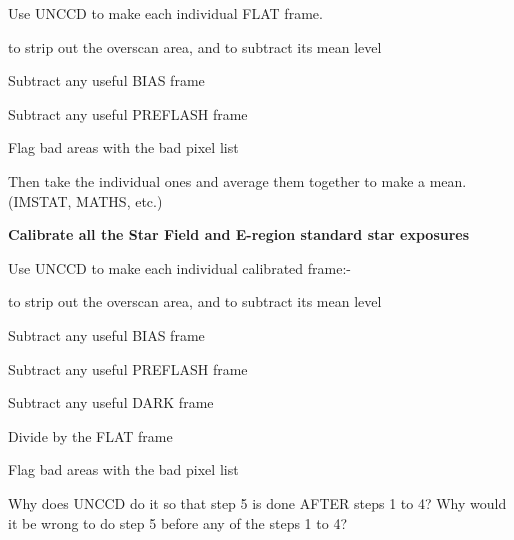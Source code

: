 {{ Use UNCCD to make each individual FLAT frame.

\begin{list}{{-}}{}
\item to strip out the overscan area, and to subtract its mean level
\item Subtract any useful BIAS frame
\item Subtract any useful PREFLASH frame
\item Flag bad areas with the bad pixel list
\end{list}
                                                                               
 Then take the individual ones and average them together to make
 a mean. (IMSTAT, MATHS, etc.)
                                                                               
                                                                               
{\hspace*{4ex} \bf  Calibrate all the Star Field and E-region standard star 
exposures}
                                                                               
 Use UNCCD to make each individual calibrated frame:-

\begin{list}{{-}}{}
\item to strip out the overscan area, and to subtract its mean level
\item Subtract any useful BIAS frame
\item Subtract any useful PREFLASH frame
\item Subtract any useful DARK frame
\item Divide by the FLAT frame
\item Flag bad areas with the bad pixel list
\end{list}
                                                                               
 Why does UNCCD do it so that step 5 is done AFTER steps 1 to 4?
 Why would it be wrong to do step 5 before any of the steps 1 to 4?
                                                                               
}}
